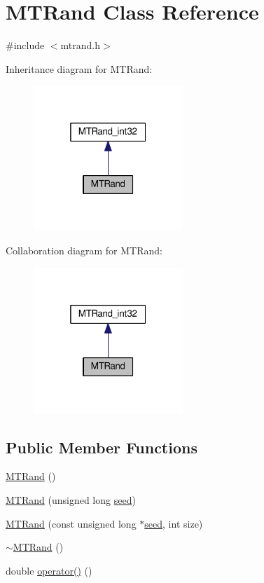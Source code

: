 \hypertarget{a00016}{\section{M\-T\-Rand Class Reference}
\label{a00016}
}


{\ttfamily \#include $<$mtrand.\-h$>$}



Inheritance diagram for M\-T\-Rand\-:\nopagebreak
\begin{figure}[H]
\begin{center}
\leavevmode
\includegraphics[width=160pt]{a00097}
\end{center}
\end{figure}


Collaboration diagram for M\-T\-Rand\-:\nopagebreak
\begin{figure}[H]
\begin{center}
\leavevmode
\includegraphics[width=160pt]{a00098}
\end{center}
\end{figure}
\subsection*{Public Member Functions}
\begin{DoxyCompactItemize}
\item 
\hyperlink{a00016_a265dc65546e26073c0d5f8787b045a1d}{M\-T\-Rand} ()
\item 
\hyperlink{a00016_a2c88736896bcbdb54bcdd7a0026720d5}{M\-T\-Rand} (unsigned long \hyperlink{a00019_a0c57076fe30358e0700a7ce1baa0ea27}{seed})
\item 
\hyperlink{a00016_a6075a3beacdfb8e4cf48d9fb56cc193a}{M\-T\-Rand} (const unsigned long $\ast$\hyperlink{a00019_a0c57076fe30358e0700a7ce1baa0ea27}{seed}, int size)
\item 
\hyperlink{a00016_a8c276546a41ae350dc9efc5e9c10a261}{$\sim$\-M\-T\-Rand} ()
\item 
double \hyperlink{a00016_abbb87a08d622d58fdee0eea4cb5471a0}{operator()} ()
\end{DoxyCompactItemize}
